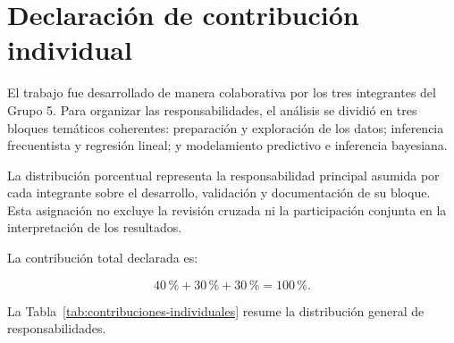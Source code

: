 \section{Declaración de contribución individual}
\label{sec:contribuciones}

El trabajo fue desarrollado de manera colaborativa por los tres
integrantes del Grupo 5. Para organizar las responsabilidades, el
análisis se dividió en tres bloques temáticos coherentes: preparación y
exploración de los datos; inferencia frecuentista y regresión lineal; y
modelamiento predictivo e inferencia bayesiana.

La distribución porcentual representa la responsabilidad principal
asumida por cada integrante sobre el desarrollo, validación y
documentación de su bloque. Esta asignación no excluye la revisión
cruzada ni la participación conjunta en la interpretación de los
resultados.

La contribución total declarada es:

\[
40\,\% + 30\,\% + 30\,\% = 100\,\%.
\]

La Tabla~\ref{tab:contribuciones-individuales} resume la distribución
general de responsabilidades.

